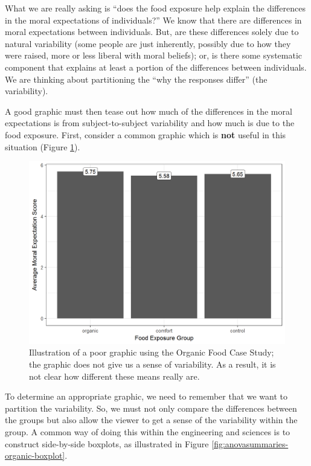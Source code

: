 \documentclass[]{book}
\theoremstyle{definition}
\theoremstyle{definition}
\theoremstyle{remark}
\begin{document}
What we are really asking is ``does the food exposure help explain the
differences in the moral expectations of individuals?'' We know that
there are differences in moral expectations between individuals. But,
are these differences solely due to natural variability (some people are
just inherently, possibly due to how they were raised, more or less
liberal with moral beliefs); or, is there some systematic component that
explains at least a portion of the differences between individuals. We
are thinking about partitioning the ``why the responses differ'' (the
variability).

A good graphic must then tease out how much of the differences in the
moral expectations is from subject-to-subject variability and how much
is due to the food exposure. First, consider a common graphic which is
\textbf{not} useful in this situation (Figure
\ref{fig:anovasummaries-bad-bar}).

\begin{figure}

{\centering \includegraphics[width=0.8\linewidth]{./Images/anovasummaries-bad-bar-1} 

}

\caption{Illustration of a poor graphic using the Organic Food Case Study; the graphic does not give us a sense of variability.  As a result, it is not clear how different these means really are.}\label{fig:anovasummaries-bad-bar}
\end{figure}

To determine an appropriate graphic, we need to remember that we want to
partition the variability. So, we must not only compare the differences
between the groups but also allow the viewer to get a sense of the
variability within the group. A common way of doing this within the
engineering and sciences is to construct side-by-side boxplots, as
illustrated in Figure \ref{fig:anovasummaries-organic-boxplot}.
\end{document}
